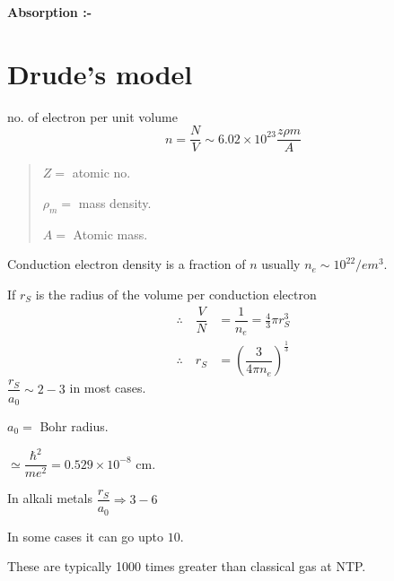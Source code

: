 \noindent
{\bf Absorption :-}

\section{Drude's model}

no. of electron per unit volume
$$
n=\dfrac{N}{V}\sim 6.02\times 10^{23}\dfrac{z\rho m}{A}
$$
\begin{quote}
$Z=$ atomic no.

$\rho_{m}=$ mass density.

$A=$ Atomic mass.
\end{quote}

Conduction electron density is a fraction of $n$ usually $n_{e}\sim 10^{22}/em^{3}$.

If $r_{S}$ is the radius of the volume per conduction electron
\begin{align*}
\therefore\quad \dfrac{V}{N} &=\dfrac{1}{n_{e}}=\frac{4}{3}\pi r^{3}_{S}\\
\therefore\quad r_{S} &= \left(\dfrac{3}{4\pi n_{e}}\right)^{\frac{1}{3}}
\end{align*}
$\dfrac{r_{S}}{a_{0}}\sim 2-3$ in most cases.

$a_{0}=$ Bohr radius.

$\simeq \dfrac{\hbar^{2}}{me^{2}}=0.529\times 10^{-8}$ cm.

In alkali metals $\dfrac{r_{S}}{a_{0}}\Rightarrow 3-6$

In some cases it can go upto $10$.

These are typically 1000 times greater than classical gas at NTP.

